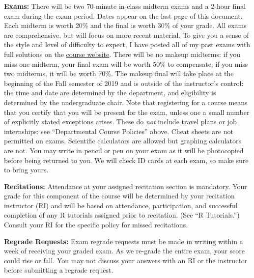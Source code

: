 \documentclass[11pt, letterpaper]{article}
\begin{document}
\medskip

\noindent \textbf{Exams:} 
There will be two 70-minute in-class midterm exams and a 2-hour final exam during the exam period.
Dates appear on the last page of this document. 
Each midterm is worth 20\% and the final is worth 30\% of your grade.
All exams are comprehensive, but will focus on more recent material.
To give you a sense of the style and level of difficulty to expect, I have posted all of my past exams with full solutions on the \href{http://ditraglia.com/Econ103Public}{course website}.
There will be no makeup midterms: if you miss one midterm, your final exam will be worth 50\% to compensate; if you miss two midterms, it will be worth 70\%.
The makeup final will take place at the beginning of the Fall semester of 2019 and is outside of the instructor's control: the time and date are determined by the department, and eligibility is determined by the undergraduate chair.
Note that registering for a course means that you certify that you will be present for the exam, unless one a small number of explicitly stated exceptions arises.
These do \emph{not} include travel plans or job internships: see ``Departmental Course Policies'' above.
Cheat sheets are not permitted on exams.
Scientific calculators are allowed but graphing calculators are not. 
You may write in pencil or pen on your exam as it will be photocopied before being returned to you.
We will check ID cards at each exam, so make sure to bring yours.

\medskip
 
\noindent \textbf{Recitations:} Attendance at your assigned recitation section is mandatory. Your grade for this component of the course will be determined by your recitation instructor (RI) and will be based on attendance, participation, and successful completion of any R tutorials assigned prior to recitation. (See ``R Tutorials.'') Consult your RI for the specific policy for missed recitations.

\medskip

\noindent \textbf{Regrade Requests:}
Exam regrade requests must be made in writing within a week of receiving your graded exam. 
As we re-grade the entire exam, your score could rise or fall. 
You may not discuss your answers with an RI or the instructor before submitting a regrade request. 
\end{document}
